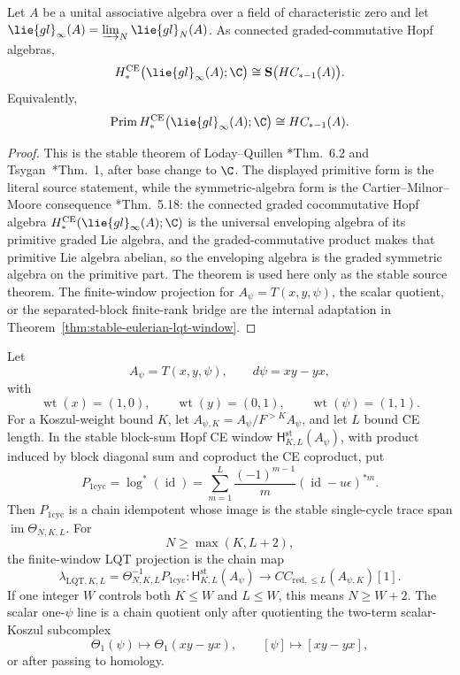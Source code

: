 \documentclass[11pt]{memoir}
\begin{document}
\begin{thm}\label{thm:lqt-stable-trace-theorem}
  Let \(A\) be a unital associative algebra over a field of characteristic
  zero and let
  \(\lie{gl}_\infty(A)=\varinjlim_N\lie{gl}_N(A)\).  As connected
  graded-commutative Hopf algebras,
  \[
    H_*^{\mathrm{CE}}\bigl(\lie{gl}_{\infty}(A);\C\bigr)
    \cong \mathbf S\bigl(HC_{*-1}(A)\bigr).
  \]
  Equivalently,
  \[
    \operatorname{Prim}H_*^{\mathrm{CE}}
      \bigl(\lie{gl}_\infty(A);\C\bigr)
    \cong HC_{*-1}(A).
  \]
\end{thm}

\begin{proof}
  This is the stable theorem of Loday--Quillen
  \cite{loday-quillen}*{Thm.~6.2} and Tsygan~\cite{tsygan}*{Thm.~1},
  after base change to \(\C\).  The displayed primitive form is the
  literal source statement, while the symmetric-algebra form is the
  Cartier--Milnor--Moore consequence
  \cite{milnor-moore-hopf}*{Thm.~5.18}: the connected graded
  cocommutative Hopf algebra
  \(H_*^{\mathrm{CE}}(\lie{gl}_\infty(A);\C)\) is the universal
  enveloping algebra of its primitive graded Lie algebra, and the
  graded-commutative product makes that primitive Lie algebra abelian,
  so the enveloping algebra is the graded symmetric algebra on the
  primitive part.
  The theorem is used here only as the stable source theorem.
  The finite-window projection for
  \(A_\psi=T(x,y,\psi)\), the scalar quotient, or the separated-block
  finite-rank bridge are the internal adaptation in
  Theorem~\ref{thm:stable-eulerian-lqt-window}.
\end{proof}

\begin{thm}\label{thm:stable-eulerian-lqt-window}
  Let
  \[
    A_\psi=T(x,y,\psi),\qquad d\psi=xy-yx,
  \]
  with
  \[
    \operatorname{wt}(x)=(1,0),\qquad
    \operatorname{wt}(y)=(0,1),\qquad
    \operatorname{wt}(\psi)=(1,1).
  \]
  For a Koszul-weight bound \(K\), let
  \(A_{\psi,K}=A_\psi/F^{>K}A_\psi\), and let \(L\) bound CE length.
  In the stable block-sum Hopf CE window
  \(\mathsf H^{\mathrm{st}}_{K,L}(A_\psi)\), with product induced by
  block diagonal sum and coproduct the CE coproduct, put
  \[
    P_{1\mathrm{cyc}}
    =
    \log^*(\operatorname{id})
    =
    \sum_{m=1}^{L}\frac{(-1)^{m-1}}{m}(\operatorname{id}-u\epsilon)^{*m}.
  \]
  Then \(P_{1\mathrm{cyc}}\) is a chain idempotent whose image is the
  stable single-cycle trace span
  \(\operatorname{im}\Theta_{N,K,L}\).  For
  \[
    N\geq\max(K,L+2),
  \]
  the finite-window LQT projection is the chain map
  \[
    \lambda_{\mathrm{LQT},K,L}
    =
    \Theta_{N,K,L}^{-1}P_{1\mathrm{cyc}}
    \colon
    \mathsf H^{\mathrm{st}}_{K,L}(A_\psi)
    \longrightarrow
    CC_{\mathrm{red},\leq L}(A_{\psi,K})[1].
  \]
  If one integer \(W\) controls both \(K\leq W\) and \(L\leq W\), this
  means \(N\geq W+2\).  The scalar one-\(\psi\) line is a chain quotient
  only after quotienting the two-term scalar-Koszul subcomplex
  \[
    \Theta_1(\psi)\longmapsto\Theta_1(xy-yx),
    \qquad
    [\psi]\longmapsto[xy-yx],
  \]
  or after passing to homology.
\end{thm}
\end{document}
